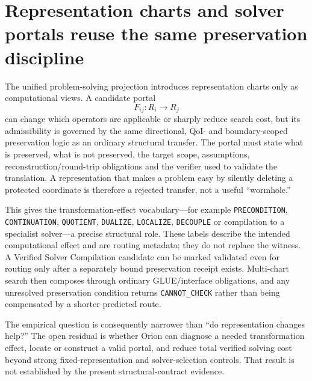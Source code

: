 \section{Representation charts and solver portals reuse the same preservation discipline}
\label{sec:solver_portals}

The unified problem-solving projection introduces representation charts only as computational views. A candidate portal
\[
F_{ij}:R_i\rightarrow R_j
\]
can change which operators are applicable or sharply reduce search cost, but its admissibility is governed by the same directional, QoI- and boundary-scoped preservation logic as an ordinary structural transfer. The portal must state what is preserved, what is not preserved, the target scope, assumptions, reconstruction/round-trip obligations and the verifier used to validate the translation. A representation that makes a problem easy by silently deleting a protected coordinate is therefore a rejected transfer, not a useful ``wormhole.''

This gives the transformation-effect vocabulary---for example \texttt{PRECONDITION}, \texttt{CONTINUATION}, \texttt{QUOTIENT}, \texttt{DUALIZE}, \texttt{LOCALIZE}, \texttt{DECOUPLE} or compilation to a specialist solver---a precise structural role. These labels describe the intended computational effect and are routing metadata; they do not replace the witness. A Verified Solver Compilation candidate can be marked validated even for routing only after a separately bound preservation receipt exists. Multi-chart search then composes through ordinary GLUE/interface obligations, and any unresolved preservation condition returns \texttt{CANNOT\_CHECK} rather than being compensated by a shorter predicted route.

The empirical question is consequently narrower than ``do representation changes help?'' The open residual is whether Orion can diagnose a needed transformation effect, locate or construct a valid portal, and reduce total verified solving cost beyond strong fixed-representation and solver-selection controls. That result is not established by the present structural-contract evidence.
